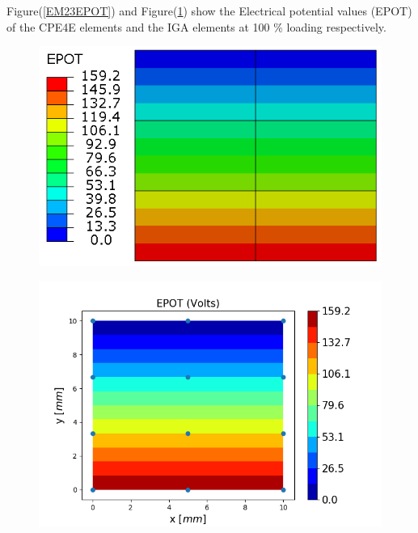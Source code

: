 \documentclass[12pt]{article}
\begin{document}
Figure(\ref{EM23EPOT}) and Figure(\ref{EM23EPOT_IGA}) show the Electrical potential values (EPOT) of the CPE4E elements and the IGA elements at 100 \% loading respectively. \\
\begin{figure}[H]
	\centering
	\begin{minipage}{.5\textwidth}
		\centering
		\includegraphics[width=1\linewidth]{EM23EPOT.png}
		\label{EM23EPOT}
	\end{minipage}%
	\begin{minipage}{.6\textwidth}
		\centering
		\includegraphics[width=1\linewidth]{EM23EPOT_IGA.png}
		\label{EM23EPOT_IGA}
	\end{minipage}
\end{figure}
\end{document}
